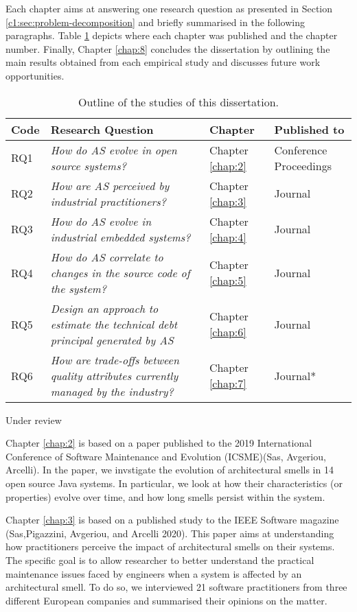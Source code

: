 Each chapter aims at answering one research question as presented in Section \ref{c1:sec:problem-decomposition} and briefly summarised in the following paragraphs.
Table \ref{c1:tab:outline} depicts where each chapter was published and the chapter number.
Finally, Chapter \ref{chap:8} concludes the dissertation by outlining the main results obtained from each empirical study and discusses future work opportunities.

\begin{table}[]
    \centering
    \caption{Outline of the studies of this dissertation.}
    \label{c1:tab:outline}
    \begin{tabular}{lm{6.5cm}lm{2cm}}
    \hline
    \textbf{Code} & \textbf{Research Question} & \textbf{Chapter} & \textbf{Published to} \\ \hline
    RQ1 & \textit{How do AS evolve in open source systems?} &  Chapter \ref{chap:2} & Conference Proceedings \\
    RQ2 & \textit{How are AS perceived by industrial practitioners?} & Chapter \ref{chap:3} & Journal \\
    RQ3 & \textit{How do AS evolve in industrial embedded systems?} &  Chapter \ref{chap:4} & Journal \\
    RQ4 & \textit{How do AS correlate to changes in the source code of the system?} &  Chapter \ref{chap:5} & Journal \\
    RQ5 & \textit{Design an approach to estimate the technical debt principal generated by AS} &  Chapter \ref{chap:6} & Journal \\
    RQ6 & \textit{How are trade-offs between quality attributes currently managed by the industry?} & Chapter \ref{chap:7} & Journal* \\ \hline
    \end{tabular}
    {\footnotesize*Under review}
\end{table}

Chapter \ref{chap:2} is based on a paper published to the 2019 International Conference of Software Maintenance and Evolution (ICSME)(Sas, Avgeriou, Arcelli).
In the paper, we invstigate the evolution of architectural smells in 14 open source Java systems.
In particular, we look at how their characteristics (or properties) evolve over time, and how long smells persist within the system. 

Chapter \ref{chap:3} is based on a published study to the IEEE Software magazine (Sas,Pigazzini, Avgeriou, and Arcelli 2020).
This paper aims at understanding how practitioners perceive the impact of architectural smells on their systems.
The specific goal is to allow researcher to better understand the practical maintenance issues faced by engineers when a system is affected by an architectural smell.
To do so, we interviewed 21 software practitioners from three different European companies and summarised their opinions on the matter.

